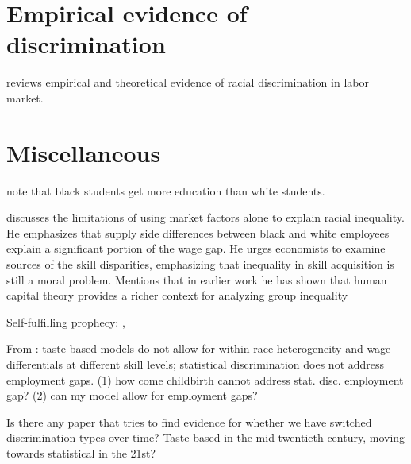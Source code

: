 \documentclass[10 pt]{article}
\begin{document}
\section{Empirical evidence of discrimination}

\begin{blist}

\item \textcite{LL12} reviews empirical and theoretical evidence of racial discrimination in labor market. 

\end{blist}




\section{Miscellaneous}


\begin{blist}

\item \textcite{LM11} note that black students get more education than white students. 

\item \textcite{L98} discusses the limitations of using market factors alone to explain racial inequality. 
He emphasizes that supply side differences between black and white employees explain a significant portion of the wage gap.
He urges economists to examine sources of the skill disparities, emphasizing that inequality in skill acquisition is still a moral problem.
Mentions that in earlier work he has shown that human capital theory provides a richer context for analyzing group inequality



\item Self-fulfilling prophecy: \textcite{LS83}, \textcite{CL93}

\item From \textcite{LL12}: taste-based models do not allow for within-race heterogeneity and wage differentials at different skill levels; statistical discrimination does not address employment gaps. (1) how come childbirth cannot address stat. disc. employment gap? (2) can my model allow for employment gaps? 

\item Is there any paper that tries to find evidence for whether we have switched discrimination types over time? Taste-based in the mid-twentieth century, moving towards statistical in the 21st? 


\end{blist}

\printbibliography
\end{document}
